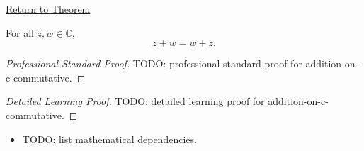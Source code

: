 \newpage
{}
\label{prf:addition-on-c-commutative}

\begin{remark*}[Return]
\hyperref[thm:addition-on-c-commutative]{Return to Theorem}
\end{remark*}

\begin{theorem*}
For all \(z,w\in\mathbb{C}\),
\[
z+w=w+z.
\]
\end{theorem*}

\begin{proof}[Professional Standard Proof]
\LRAProofBodyStart
TODO: professional standard proof for addition-on-c-commutative.
\end{proof}

\begin{proof}[Detailed Learning Proof]
\LRAProofBodyStart
TODO: detailed learning proof for addition-on-c-commutative.
\end{proof}

\begin{remark*}
\end{remark*}

\begin{dependencies}
\begin{itemize}
  \item TODO: list mathematical dependencies.
\end{itemize}
\end{dependencies}

\clearpage
